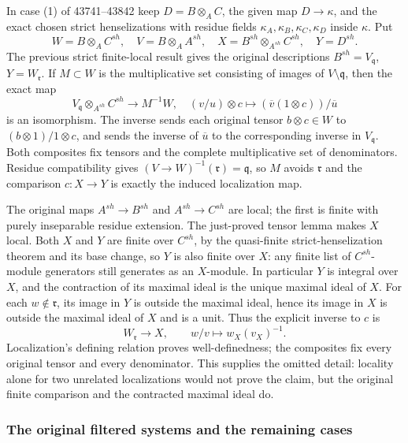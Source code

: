 In case (1) of 43741--43842 keep \(D=B\otimes_A C\), the given map \(D\to\kappa\), and the exact chosen strict henselizations with residue fields \(\kappa_A,\kappa_B,\kappa_C,\kappa_D\) inside \(\kappa\). Put \[
 W=B\otimes_A C^{sh},\quad V=B\otimes_A A^{sh},\quad
 X=B^{sh}\otimes_{A^{sh}}C^{sh},\quad Y=D^{sh}.
\] The previous strict finite-local result gives the original descriptions \(B^{sh}=V_{\mathfrak q}\), \(Y=W_{\mathfrak r}\). If \(M\subset W\) is the multiplicative set consisting of images of \(V\setminus\mathfrak q\), then the exact map \[
 V_{\mathfrak q}\otimes_{A^{sh}}C^{sh}\longrightarrow M^{-1}W,
 \quad (v/u)\otimes c\longmapsto (\overline v(1\otimes c))/\overline u
\] is an isomorphism. The inverse sends each original tensor \(b\otimes c\in W\) to \((b\otimes1)/1\otimes c\), and sends the inverse of \(\overline u\) to the corresponding inverse in \(V_{\mathfrak q}\). Both composites fix tensors and the complete multiplicative set of denominators. Residue compatibility gives \((V\to W)^{-1}(\mathfrak r)=\mathfrak q\), so \(M\) avoids \(\mathfrak r\) and the comparison \(c:X\to Y\) is exactly the induced localization map.

The original maps \(A^{sh}\to B^{sh}\) and \(A^{sh}\to C^{sh}\) are local; the first is finite with purely inseparable residue extension. The just-proved tensor lemma makes \(X\) local. Both \(X\) and \(Y\) are finite over \(C^{sh}\), by the quasi-finite strict-henselization theorem and its base change, so \(Y\) is also finite over \(X\): any finite list of \(C^{sh}\)-module generators still generates as an \(X\)-module. In particular \(Y\) is integral over \(X\), and the contraction of its maximal ideal is the unique maximal ideal of \(X\). For each \(w\notin\mathfrak r\), its image in \(Y\) is outside the maximal ideal, hence its image in \(X\) is outside the maximal ideal of \(X\) and is a unit. Thus the explicit inverse to \(c\) is \[
 W_{\mathfrak r}\longrightarrow X,\qquad w/v\longmapsto w_X(v_X)^{-1}.
\] Localization's defining relation proves well-definedness; the composites fix every original tensor and every denominator. This supplies the omitted detail: locality alone for two unrelated localizations would not prove the claim, but the original finite comparison and the contracted maximal ideal do.

\subsubsection{The original filtered systems and the remaining cases}\label{algebra-proof-061-the-original-filtered-systems-and-the-remaining-cases}

